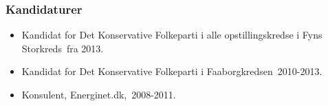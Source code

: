 \documentclass[11pt, a4paper]{awesome-cv}
\begin{document}
\begin{cvletter}
\subsubsection*{Kandidaturer}
\begin{itemize}
\item Kandidat for Det Konservative Folkeparti i alle opstillingskredse i Fyns Storkreds fra 2013.
\item Kandidat for Det Konservative Folkeparti i Faaborgkredsen 2010-2013.
\end{itemize}
\begin{itemize}
\item Konsulent, Energinet.dk, 2008-2011.
\end{itemize}
\end{cvletter}
\end{document}

